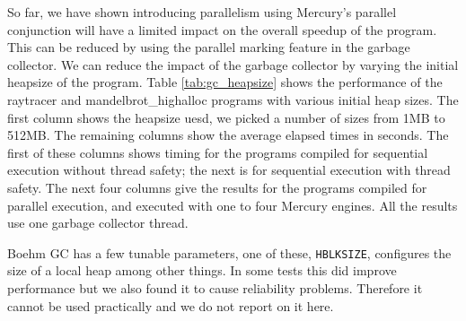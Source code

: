 


So far,
we have shown introducing parallelism using Mercury's parallel conjunction
will have a limited impact on the overall speedup of the program.
This can be reduced by using the parallel marking feature in the garbage
collector.
We can reduce the impact of the garbage collector by varying the initial
heapsize of the program.
Table \ref{tab:gc_heapsize} shows the performance of the raytracer and
mandelbrot\_highalloc programs with various initial heap sizes.
The first column shows the heapsize uesd,
we picked a number of sizes from 1MB to 512MB.
The remaining columns show the average elapsed times in seconds.
The first of these columns shows timing for the programs compiled for
sequential execution without thread safety;
the next is for sequential execution with thread safety.
The next four columns give the results for the programs compiled for
parallel execution, and executed with one to four Mercury engines.
All the results use one garbage collector thread.



Boehm GC has a few tunable parameters, one of these, \texttt{HBLKSIZE},
configures the size of a local heap among other things.
In some tests this did improve performance but we also found it to cause
reliability problems.
Therefore it cannot be used practically and we do not report on it here.

